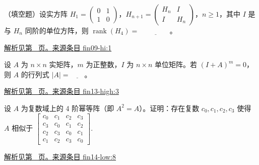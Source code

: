 \documentclass[UTF8,12pt,a4paper,fontset=fandol]{ctexart}
\begin{document}
\begin{example}\label{ex:fin09-hi:1}

（填空题）设实方阵 $H_{1}=\begin{pmatrix}0&1\\1&0\end{pmatrix}$，$H_{n+1}=\begin{pmatrix}H_{n}&I\\I&H_{n}\end{pmatrix}$，$n \geq 1$，其中 $I$ 是与 $H_{n}$ 同阶的单位方阵，则 $\operatorname{rank}(H_{4})=$ $\underline{\qquad\qquad}$。

\par\hyperref[ans:fin09-hi:1]{解析见第~\pageref{ans:fin09-hi:1} 页。}\quad\href{https://github.com/lzxcr/cmc-mathematics/blob/64916fa1fdbc3e444a652eca204d5669058ee321/src/problems/finals/09/01.md}{来源条目 fin09-hi:1}

\end{example}

\begin{example}\label{ex:fin13-high:3}

设 $A$ 为 $n \times n$ 实矩阵，$m$ 为正整数，$I$ 为 $n \times n$ 单位矩阵。若 $(I+A)^m = 0$，则 $A$ 的行列式 $|A| = \underline{\qquad}$。

\par\hyperref[ans:fin13-high:3]{解析见第~\pageref{ans:fin13-high:3} 页。}\quad\href{https://github.com/lzxcr/cmc-mathematics/blob/64916fa1fdbc3e444a652eca204d5669058ee321/src/problems/finals/13/03.md}{来源条目 fin13-high:3}

\end{example}

\begin{example}\label{ex:fin14-low:8}

设 $A$ 为复数域上的 4 阶幂等阵（即 $A^2 = A$）。证明：存在复数 $c_0, c_1, c_2, c_3$ 使得 $A$ 相似于 $\begin{bmatrix} c_0 & c_1 & c_2 & c_3 \\ c_3 & c_0 & c_1 & c_2 \\ c_2 & c_3 & c_0 & c_1 \\ c_1 & c_2 & c_3 & c_0 \end{bmatrix}.$

\par\hyperref[ans:fin14-low:8]{解析见第~\pageref{ans:fin14-low:8} 页。}\quad\href{https://github.com/lzxcr/cmc-mathematics/blob/64916fa1fdbc3e444a652eca204d5669058ee321/src/problems/finals/14/08.md}{来源条目 fin14-low:8}

\end{example}
\end{document}
